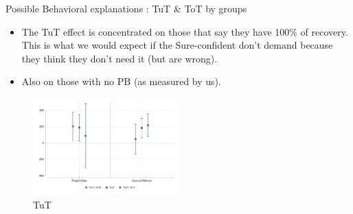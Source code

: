 \documentclass[8pt]{beamer}
\begin{document}
\begin{frame}{Possible Behavioral explanations : TuT \& ToT by groups}

\begin{itemize}
    \item The TuT effect is concentrated on those that say they have 100\% of recovery. This is what we would expect if the Sure-confident don't demand because they think they don't need it (but are wrong).
    \item Also on those with no PB (as measured by us).
\end{itemize}
\begin{figure}[H]
    \caption{TuT}
        \includegraphics[width=0.5\textwidth]{Figuras/tut_beh_partition.pdf}
\end{figure}
\end{frame}
\end{document}
